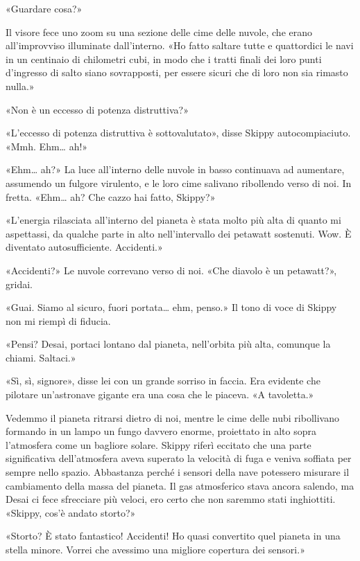 «Guardare cosa?»

Il visore fece uno zoom su una sezione delle cime delle nuvole, che
erano all'improvviso illuminate dall'interno. «Ho fatto saltare tutte e
quattordici le navi in un centinaio di chilometri cubi, in modo che i
tratti finali dei loro punti d'ingresso di salto siano sovrapposti, per
essere sicuri che di loro non sia rimasto nulla.»

«Non è un eccesso di potenza distruttiva?»

«L'eccesso di potenza distruttiva è sottovalutato», disse Skippy
autocompiaciuto. «Mmh. Ehm\ldots{} ah!»

«Ehm\ldots{} ah?» La luce all'interno delle nuvole in basso continuava
ad aumentare, assumendo un fulgore virulento, e le loro cime salivano
ribollendo verso di noi. In fretta. «Ehm\ldots{} ah? Che cazzo hai
fatto, Skippy?»

«L'energia rilasciata all'interno del pianeta è stata molto più alta di
quanto mi aspettassi, da qualche parte in alto nell'intervallo dei
petawatt sostenuti. Wow. È diventato autosufficiente. Accidenti.»

«Accidenti?» Le nuvole correvano verso di noi. «Che diavolo è un
petawatt?», gridai.

«Guai. Siamo al sicuro, fuori portata\ldots{} ehm, penso.» Il tono di
voce di Skippy non mi riempì di fiducia.

«Pensi? Desai, portaci lontano dal pianeta, nell'orbita più alta,
comunque la chiami. Saltaci.»

«Sì, sì, signore», disse lei con un grande sorriso in faccia. Era
evidente che pilotare un'astronave gigante era una cosa che le piaceva.
«A tavoletta.»

Vedemmo il pianeta ritrarsi dietro di noi, mentre le cime delle nubi
ribollivano formando in un lampo un fungo davvero enorme, proiettato in
alto sopra l'atmosfera come un bagliore solare. Skippy riferì eccitato
che una parte significativa dell'atmosfera aveva superato la velocità di
fuga e veniva soffiata per sempre nello spazio. Abbastanza perché i
sensori della nave potessero misurare il cambiamento della massa del
pianeta. Il gas atmosferico stava ancora salendo, ma Desai ci fece
sfrecciare più veloci, ero certo che non saremmo stati inghiottiti.
«Skippy, cos'è andato storto?»

«Storto? È stato fantastico! Accidenti! Ho quasi convertito quel pianeta
in una stella minore. Vorrei che avessimo una migliore copertura dei
sensori.»

